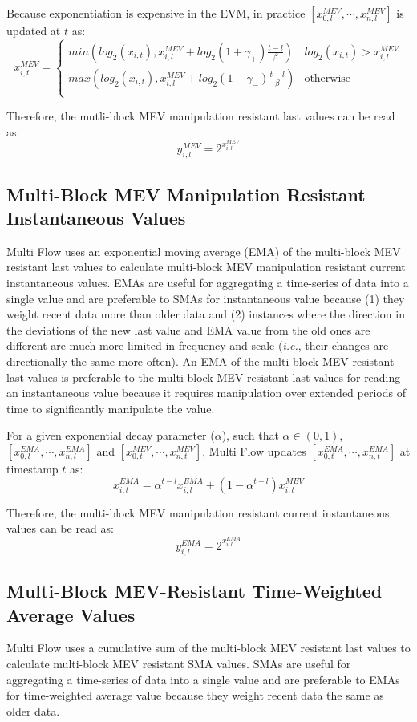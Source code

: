 \documentclass[tikz]{article}
\begin{document}
Because exponentiation is expensive in the EVM, in practice $[x^{MEV}_{0,l}, \cdots, x^{MEV}_{n,l}]$ is updated at $t$ as:
$$
x^{MEV}_{i,t} = 
\begin{cases}
min\left(log_2(x_{i,t}), x^{MEV}_{i,l} + log_2(1+\gamma_+) \frac{t-l}{\beta}\right) & log_2(x_{i,t}) > x^{MEV}_{i,l} \\
max\left(log_2(x_{i,t}), x^{MEV}_{i,l} + log_2(1-\gamma_-) \frac{t-l}{\beta}\right) & \text{otherwise} \\
\end{cases}
$$

Therefore, the mutli-block MEV manipulation resistant last values can be read as: 
$$
y^{MEV}_{i,l} = 2^{x^{MEV}_{i,l}}
$$

\subsection{Multi-Block MEV Manipulation Resistant Instantaneous Values}
Multi Flow uses an exponential moving average (EMA) of the multi-block MEV resistant last values to calculate multi-block MEV manipulation resistant current instantaneous values. EMAs are useful for aggregating a time-series of data into a single value and are preferable to SMAs for instantaneous value because (1) they weight recent data more than older data and (2) instances where the direction in the deviations of the new last value and EMA value from the old ones are different are much more limited in frequency and scale (\textit{i.e.}, their changes are directionally the same more often). An EMA of the multi-block MEV resistant last values is preferable to the multi-block MEV resistant last values for reading an instantaneous value because it requires manipulation over extended periods of time to significantly manipulate the value.

For a given exponential decay parameter ($\alpha$), such that $\alpha \in (0,1)$, $[x^{EMA}_{0,l}, \cdots, x^{EMA}_{n,l}]$ and $[x^{MEV}_{0,t}, \cdots, x^{MEV}_{n,t}]$, Multi Flow updates $[x^{EMA}_{0,t}, \cdots, x^{EMA}_{n,t}]$ at timestamp $t$ as:
$$
x^{EMA}_{i,t} = \alpha^{t-l} x^{EMA}_{i,l} + (1 - \alpha^{t-l}) x^{MEV}_{i,t}
$$

Therefore, the multi-block MEV manipulation resistant current instantaneous values can be read as: 
$$
y^{EMA}_{i,l} = 2^{x^{EMA}_{i,l}}
$$

\subsection{Multi-Block MEV-Resistant Time-Weighted Average Values}
Multi Flow uses a cumulative sum of the multi-block MEV resistant last values to calculate multi-block MEV resistant SMA values. SMAs are useful for aggregating a time-series of data into a single value and are preferable to EMAs for time-weighted average value because they weight recent data the same as older data.
\end{document}
